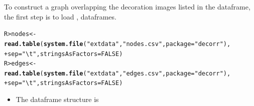 \documentclass[article]{jss}\usepackage[]{graphicx}\usepackage[]{color}
\makeatletter
\newcommand{\hlnum}[1]{\textcolor[rgb]{0.686,0.059,0.569}{#1}}%
\newcommand{\hlstr}[1]{\textcolor[rgb]{0.192,0.494,0.8}{#1}}%
\newcommand{\hlstd}[1]{\textcolor[rgb]{0.345,0.345,0.345}{#1}}%
\newcommand{\hlkwb}[1]{\textcolor[rgb]{0.69,0.353,0.396}{#1}}%
\newcommand{\hlkwc}[1]{\textcolor[rgb]{0.333,0.667,0.333}{#1}}%
\newcommand{\hlkwd}[1]{\textcolor[rgb]{0.737,0.353,0.396}{\textbf{#1}}}%
\newenvironment{kframe}{%
 \def\at@end@of@kframe{}%
 \ifinner\ifhmode%
  \def\at@end@of@kframe{\end{minipage}}%
  \begin{minipage}{\columnwidth}%
 \fi\fi%
 \def\FrameCommand##1{\hskip\@totalleftmargin \hskip-\fboxsep
 \colorbox{shadecolor}{##1}\hskip-\fboxsep
     \hskip-\linewidth \hskip-\@totalleftmargin \hskip\columnwidth}%
 \MakeFramed {\advance\hsize-\width
   \@totalleftmargin\z@ \linewidth\hsize
   \@setminipage}}%
 {\par\unskip\endMakeFramed%
 \at@end@of@kframe}
\newenvironment{knitrout}{}{} %
\makeatother
\begin{document}
To construct a graph overlapping the decoration images listed in the  dataframe, the first step is to load ,  dataframes.

\begin{knitrout}
\color{fgcolor}\begin{kframe}
\begin{alltt}
\hlstd{R> }\hlstd{nodes} \hlkwb{<-} \hlkwd{read.table}\hlstd{(}\hlkwd{system.file}\hlstd{(}\hlstr{"extdata"}\hlstd{,} \hlstr{"nodes.csv"}\hlstd{,} \hlkwc{package} \hlstd{=} \hlstr{"decorr"}\hlstd{),}
\hlstd{+ }                    \hlkwc{sep}\hlstd{=}\hlstr{"\textbackslash{}t"}\hlstd{,}\hlkwc{stringsAsFactors} \hlstd{=} \hlnum{FALSE}\hlstd{)}
\hlstd{R> }\hlstd{edges} \hlkwb{<-} \hlkwd{read.table}\hlstd{(}\hlkwd{system.file}\hlstd{(}\hlstr{"extdata"}\hlstd{,} \hlstr{"edges.csv"}\hlstd{,} \hlkwc{package} \hlstd{=} \hlstr{"decorr"}\hlstd{),}
\hlstd{+ }                    \hlkwc{sep}\hlstd{=}\hlstr{"\textbackslash{}t"}\hlstd{,}\hlkwc{stringsAsFactors} \hlstd{=} \hlnum{FALSE}\hlstd{)}
\end{alltt}
\end{kframe}
\end{knitrout}

\begin{itemize}
\item The  dataframe structure is
\end{itemize}
\end{document}
